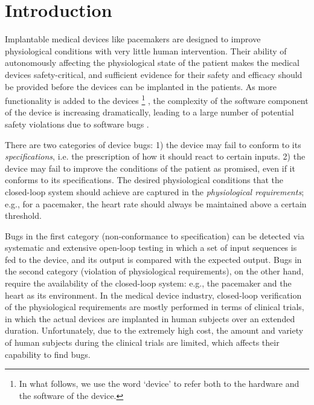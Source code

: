 \section{Introduction}
\label{introduction}

Implantable medical devices like pacemakers are designed to improve physiological conditions with very little human intervention. 
Their ability of autonomously affecting the physiological state of the patient makes the medical devices safety-critical, and sufficient evidence for their safety and efficacy should be provided before the devices can be implanted in the patients. 
As more functionality is added to the devices
\footnote{In what follows, we use the word `device' to refer both to the hardware and the software of the device.}
, the complexity of the software component of the device is increasing dramatically, leading to a large number of potential safety violations due to software bugs \cite{recall_stats}.


There are two categories of device bugs: 
1) the device may fail to conform to its \emph{specifications}, i.e. the prescription of how it should react to certain inputs.  
2) the device may fail to improve the conditions of the patient as promised, even if it conforms to its specifications. 
The desired physiological conditions that the closed-loop system should achieve are captured in the \emph{physiological requirements}; e.g., for a pacemaker, the heart rate should always be maintained above a certain threshold. 

Bugs in the first category (non-conformance to specification) can be detected via systematic and extensive open-loop testing in which a set of input sequences is fed to the device, and its output is compared with the expected output.
Bugs in the second category (violation of physiological requirements), on the other hand, require the availability of the closed-loop system: e.g., the pacemaker and the heart as its environment. 
In the medical device industry, closed-loop verification of the physiological requirements are mostly performed in terms of clinical trials, in which the actual devices are implanted in human subjects over an extended duration.
Unfortunately, due to the extremely high cost, the amount and variety of human subjects during the clinical trials are limited, which affects their capability to find bugs. 

